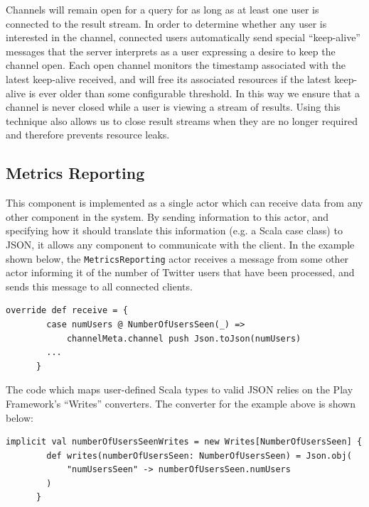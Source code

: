 \documentclass{l4proj}
\newcommand{\code}[1]{\texttt{#1}}
\begin{document}
        Channels will remain open for a query for as long as at least one user is connected to the result stream. In order to determine whether any user is interested in the channel, connected users automatically send special ``keep-alive'' messages that the server interprets as a user expressing a desire to keep the channel open. Each open channel monitors the timestamp associated with the latest keep-alive received, and will free its associated resources if the latest keep-alive is ever older than some configurable threshold. In this way we ensure that a channel is never closed while a user is viewing a stream of results. Using this technique also allows us to close result streams when they are no longer required and therefore prevents resource leaks.
        
     
        
    \subsection{Metrics Reporting}
    This component is implemented as a single actor which can receive data from any other component in the system. By sending information to this actor, and specifying how it should translate this information (e.g. a Scala case class) to JSON, it allows any component to communicate with the client. In the example shown below, the \code{MetricsReporting} actor receives a message from some other actor informing it of the number of Twitter users that have been processed, and sends this message to all connected clients.
    
    \begin{lstlisting}[caption=Forwarding new messages through the WebSocket to connected clients.]
      override def receive = {
        case numUsers @ NumberOfUsersSeen(_) => 
            channelMeta.channel push Json.toJson(numUsers)
        ...
      }
    \end{lstlisting}

The code which maps user-defined Scala types to valid JSON relies on the Play Framework's ``Writes'' converters. The converter for the example above is shown below:

    \begin{lstlisting}[caption=Code for conversion of the NumberOfUsersSeen Scala case class to JSON format.]
      implicit val numberOfUsersSeenWrites = new Writes[NumberOfUsersSeen] {
        def writes(numberOfUsersSeen: NumberOfUsersSeen) = Json.obj(
            "numUsersSeen" -> numberOfUsersSeen.numUsers
        )
      }
    \end{lstlisting}
\end{document}
